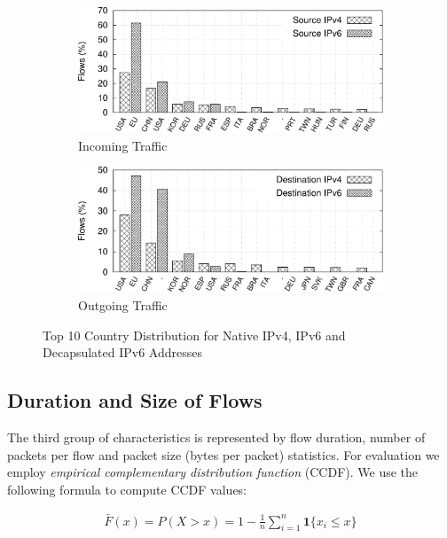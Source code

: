 \begin{figure}[!tb]
     \begin{subfigure}{\textwidth}
        \includegraphics[width=0.97\linewidth]{figures/paper-tunnels/ctry_distribution/ctry_distribution-native-in}
        \caption{Incoming Traffic}
        \label{fig:ipv6-tunnels-geo-native-in}
    \end{subfigure}
    \hfill
    \begin{subfigure}{\textwidth}
        \includegraphics[width=0.97\linewidth]{figures/paper-tunnels/ctry_distribution/ctry_distribution-native-out}
        \caption{Outgoing Traffic}
        \label{fig:ipv6-tunnels-geo-native-out}
    \end{subfigure}
    \caption{Top 10 Country Distribution for Native IPv4, IPv6 and Decapsulated IPv6 Addresses}
    \label{fig:ipv6-tunnels-top-ten-geo}
\end{figure}

\subsection{Duration and Size of Flows}
The third group of characteristics is represented by flow duration, number of packets per flow and packet size (bytes per packet) statistics. For evaluation we employ \textit{empirical complementary distribution function} (CCDF). We use the following formula to compute CCDF values:

\begin{align}
    \bar{F}(x)= P(X>x)=1-\frac{1}{n}\sum^{n}_{i=1}\mathbf{1}\{x_{i}\leq x\}
\end{align}

